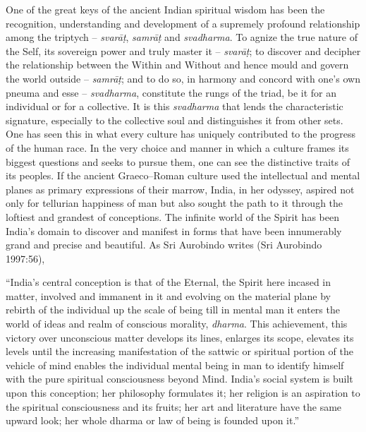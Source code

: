 One of the great keys of the ancient Indian spiritual wisdom has been the recognition, understanding and development of a supremely profound relationship among the triptych – \textit{svarāṭ}, \textit{samrāṭ} and \textit{svadharma}. To agnize the true nature of the Self, its sovereign power and truly master it – \textit{svarāṭ}; to discover and decipher the relationship between the Within and Without and hence mould and govern the world outside – \textit{samrāṭ}; and to do so, in harmony and concord with one’s own pneuma and esse – \textit{svadharma}, constitute the rungs of the triad, be it for an individual or for a collective. It is this \textit{svadharma} that lends the characteristic signature, especially to the collective soul and distinguishes it from other sets. One has seen this in what every culture has uniquely contributed to the progress of the human race. In the very choice and manner in which a culture frames its biggest questions and seeks to pursue them, one can see the distinctive traits of its peoples. If the ancient Graeco–Roman culture used the intellectual and mental planes as primary expressions of their marrow, India, in her odyssey, aspired not only for tellurian happiness of man but also sought the path to it through the loftiest and grandest of conceptions. The infinite world of the Spirit has been India’s domain to discover and manifest in forms that have been innumerably grand and precise and beautiful. As Sri Aurobindo writes (Sri Aurobindo 1997:56),

\begin{myquote}
“India’s central conception is that of the Eternal, the Spirit here incased in matter, involved and immanent in it and evolving on the material plane by rebirth of the individual up the scale of being till in mental man it enters the world of ideas and realm of conscious morality, \textit{dharma}. This achievement, this victory over unconscious matter develops its lines, enlarges its scope, elevates its levels until the increasing manifestation of the sattwic or spiritual portion of the vehicle of mind enables the individual mental being in man to identify himself with the pure spiritual consciousness beyond Mind. India’s social system is built upon this conception; her philosophy formulates it; her religion is an aspiration to the spiritual consciousness and its fruits; her art and literature have the same upward look; her whole dharma or law of being is founded upon it.”
\end{myquote}

